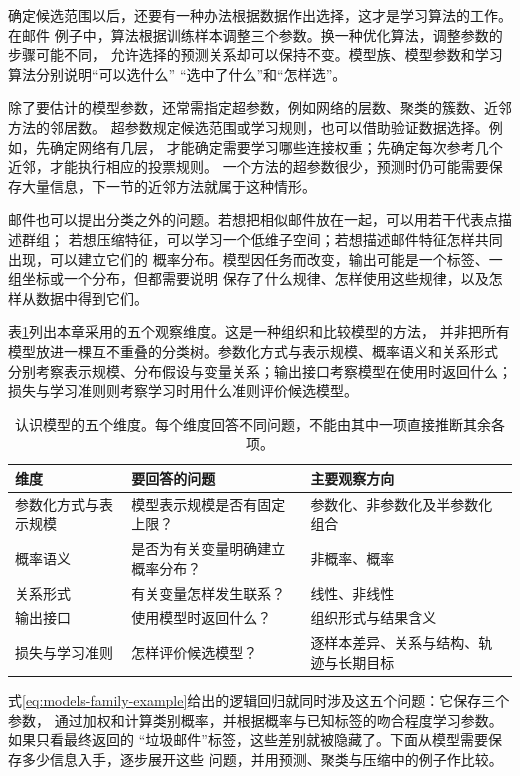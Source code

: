 确定候选范围以后，还要有一种办法根据数据作出选择，这才是学习算法的工作。在邮件
例子中，算法根据训练样本调整三个参数。换一种优化算法，调整参数的步骤可能不同，
允许选择的预测关系却可以保持不变。模型族、模型参数和学习算法分别说明“可以选什么”
“选中了什么”和“怎样选”。

除了要估计的模型参数，还常需指定超参数，例如网络的层数、聚类的簇数、近邻方法的邻居数。
超参数规定候选范围或学习规则，也可以借助验证数据选择。例如，先确定网络有几层，
才能确定需要学习哪些连接权重；先确定每次参考几个近邻，才能执行相应的投票规则。
一个方法的超参数很少，预测时仍可能需要保存大量信息，下一节的近邻方法就属于这种情形。

邮件也可以提出分类之外的问题。若想把相似邮件放在一起，可以用若干代表点描述群组；
若想压缩特征，可以学习一个低维子空间；若想描述邮件特征怎样共同出现，可以建立它们的
概率分布。模型因任务而改变，输出可能是一个标签、一组坐标或一个分布，但都需要说明
保存了什么规律、怎样使用这些规律，以及怎样从数据中得到它们。

表\ref{tab:models-dimensions}列出本章采用的五个观察维度。这是一种组织和比较模型的方法，
并非把所有模型放进一棵互不重叠的分类树。参数化方式与表示规模、概率语义和关系形式
分别考察表示规模、分布假设与变量关系；输出接口考察模型在使用时返回什么；
损失与学习准则则考察学习时用什么准则评价候选模型。

\begin{table}[htbp]
  \centering
  \small
  \begin{tabularx}{\linewidth}{@{}lXX@{}}
    \toprule
    \textbf{维度} & \textbf{要回答的问题} & \textbf{主要观察方向} \\
    \midrule
参数化方式与表示规模 & 模型表示规模是否有固定上限？ & 参数化、非参数化及半参数化组合 \\
    概率语义 & 是否为有关变量明确建立概率分布？ & 非概率、概率 \\
    关系形式 & 有关变量怎样发生联系？ & 线性、非线性 \\
    输出接口 & 使用模型时返回什么？ & 组织形式与结果含义 \\
    损失与学习准则 & 怎样评价候选模型？ & 逐样本差异、关系与结构、轨迹与长期目标 \\
    \bottomrule
  \end{tabularx}
  \caption{认识模型的五个维度。每个维度回答不同问题，不能由其中一项直接推断其余各项。}
  \label{tab:models-dimensions}
\end{table}

式\eqref{eq:models-family-example}给出的逻辑回归就同时涉及这五个问题：它保存三个参数，
通过加权和计算类别概率，并根据概率与已知标签的吻合程度学习参数。如果只看最终返回的
“垃圾邮件”标签，这些差别就被隐藏了。下面从模型需要保存多少信息入手，逐步展开这些
问题，并用预测、聚类与压缩中的例子作比较。

